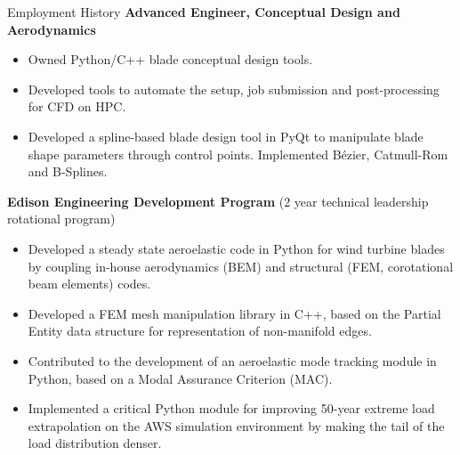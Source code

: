 \begin{rubric}{Employment History}
\entry*[2023 -- Present]%
	\textbf{Advanced Engineer, Conceptual Design and Aerodynamics}
 \begin{itemize}
     \item Owned Python/C++ blade conceptual design tools.
     \item Developed tools to automate the setup, job submission and post-processing for CFD on HPC.
     \item Developed a spline-based blade design tool in PyQt to manipulate blade shape parameters through control points. Implemented Bézier, Catmull-Rom and B-Splines.
 \end{itemize}
%
%
\entry*[2021 -- 2023]%
	\textbf{Edison Engineering Development Program} (2 year technical leadership rotational program)
 \begin{itemize}
     \item Developed a steady state aeroelastic code in Python for wind turbine blades by coupling in-house aerodynamics (BEM) and structural (FEM, corotational beam elements) codes.
     \item Developed a FEM mesh manipulation library in C++, based on the Partial Entity data structure for representation of non-manifold edges.
     \item Contributed to the development of an aeroelastic mode tracking module in Python, based on a Modal Assurance Criterion (MAC).
     \item Implemented a critical Python module for improving 50-year extreme load extrapolation on the AWS simulation environment by making the tail of the load distribution denser.
\end{itemize}
\end{rubric}